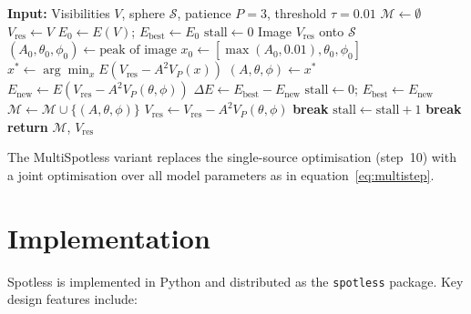 \documentclass[a4paper,11pt]{article}
\begin{document}
\begin{algorithm}[htbp]
	\caption{Spotless Deconvolution}
	\label{alg:spotless}
	\begin{algorithmic}[1]
		\State \textbf{Input:} Visibilities $V$, sphere $\mathcal{S}$, patience $P=3$, threshold $\tau = 0.01$
		\State $\mathcal{M} \leftarrow \emptyset$
		\State $V_{\text{res}} \leftarrow V$
		\State $E_0 \leftarrow E(V)$; \quad $E_{\text{best}} \leftarrow E_0$ 
		\State $\text{stall} \leftarrow 0$
		\Repeat
		\State Image $V_{\text{res}}$ onto $\mathcal{S}$
		\State $(A_0, \theta_0, \phi_0) \leftarrow \text{peak of image}$
		\State $x_0 \leftarrow [\max(A_0, 0.01), \theta_0, \phi_0]$
		\State $x^* \leftarrow \arg\min_x E(V_{\text{res}} - A^2 V_P(x))$
		\State $(A, \theta, \phi) \leftarrow x^*$
		\State $E_{\text{new}} \leftarrow E(V_{\text{res}} - A^2 V_P(\theta, \phi))$
		\State $\Delta E \leftarrow E_{\text{best}} - E_{\text{new}}$
		\State $\text{stall} \leftarrow 0$; \quad $E_{\text{best}} \leftarrow E_{\text{new}}$
		\State $\mathcal{M} \leftarrow \mathcal{M} \cup \{(A, \theta, \phi)\}$
		\State $V_{\text{res}} \leftarrow V_{\text{res}} - A^2 V_P(\theta, \phi)$
		 \textbf{break} \EndIf
		\Else
		\State $\text{stall} \leftarrow \text{stall} + 1$
		 \textbf{break} \EndIf
		\EndIf
		\State \textbf{return} $\mathcal{M}$, $V_{\text{res}}$
	\end{algorithmic}
\end{algorithm}

The MultiSpotless variant replaces the single-source optimisation
(step~10) with a joint optimisation over all model parameters as in
equation~\eqref{eq:multistep}.

\section{Implementation}

Spotless is implemented in Python and distributed as the
\texttt{spotless} package. Key design features include:
\end{document}
